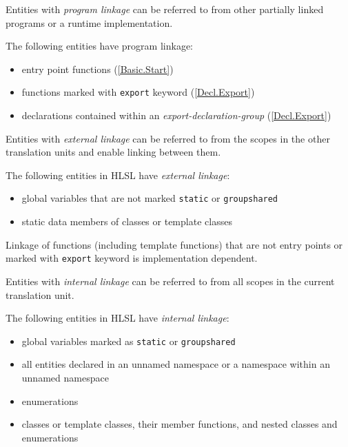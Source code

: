 
\p Entities with \textit{program linkage} can be referred to from other
partially linked programs or a runtime implementation.

\p The following entities have program linkage:
\begin{itemize}
  \item entry point functions (\ref{Basic.Start})
  \item functions marked with \texttt{export} keyword (\ref{Decl.Export})
  \item declarations contained within an \textit{export-declaration-group} (\ref{Decl.Export})
\end{itemize}


\p Entities with \textit{external linkage} can be referred to from the scopes in
the other translation units and enable linking between them.

\p The following entities in HLSL have \textit{external linkage}:
\begin{itemize}
  \item global variables that are not marked \texttt{static} or \texttt{groupshared}
  \item static data members of classes or template classes
\end{itemize}

\p Linkage of functions (including template functions) that are not entry points
or marked with \texttt{export} keyword is implementation dependent.


\p Entities with \textit{internal linkage} can be referred to from all scopes in
the current translation unit.

\p The following entities in HLSL have \textit{internal linkage}:
\begin{itemize}
  \item global variables marked as \texttt{static} or \texttt{groupshared}
  \item all entities declared in an unnamed namespace or a namespace within an
  unnamed namespace
  \item enumerations
  \item classes or template classes, their member functions, and nested classes
  and enumerations
\end{itemize}

